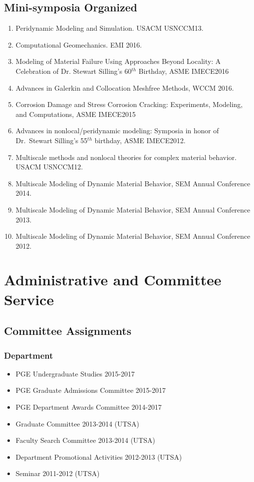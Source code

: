 \subsection*{Mini-symposia Organized}

\begin{enumerate}
    \item Peridynamic Modeling and Simulation. USACM USNCCM13.
    \item Computational Geomechanics. EMI 2016.
    \item Modeling of Material Failure Using Approaches Beyond Locality: A Celebration of Dr. Stewart Silling's 60$^{th}$ Birthday, ASME IMECE2016
    \item Advances in Galerkin and Collocation Meshfree Methods, WCCM 2016.
    \item Corrosion Damage and Stress Corrosion Cracking: Experiments, Modeling, and Computations, ASME IMECE2015
    \item Advances in nonlocal/peridynamic modeling: Symposia in honor of Dr.~Stewart Silling's 55$^{th}$ birthday, ASME IMECE2012.
    \item Multiscale methods and nonlocal theories for complex material behavior. USACM USNCCM12.
    \item Multiscale Modeling of Dynamic Material Behavior, SEM Annual Conference 2014.
    \item Multiscale Modeling of Dynamic Material Behavior, SEM Annual Conference 2013.
    \item Multiscale Modeling of Dynamic Material Behavior, SEM Annual Conference 2012.
\end{enumerate}

\section*{Administrative and Committee Service}
\subsection*{Committee Assignments}
\subsubsection*{Department}
\begin{itemize}
    \item PGE Undergraduate Studies 2015-2017
    \item PGE Graduate Admissions Committee 2015-2017
    \item PGE Department Awards Committee 2014-2017
    \item Graduate Committee 2013-2014 (UTSA)
    \item Faculty Search Committee 2013-2014 (UTSA)
    \item Department Promotional Activities 2012-2013 (UTSA)
    \item Seminar 2011-2012 (UTSA)
\end{itemize}

